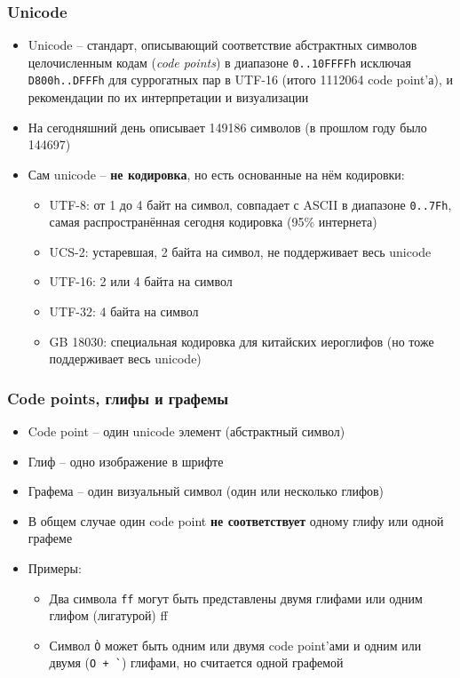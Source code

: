 \documentclass{beamer}
\begin{document}
\begin{frame}[fragile]
\frametitle{Unicode}
\begin{itemize}
\item Unicode -- стандарт, описывающий соответствие абстрактных символов целочисленным кодам (\textit{code points}) в диапазоне \verb|0..10FFFFh| исключая \verb|D800h..DFFFh| для суррогатных пар в UTF-16 (итого 1112064 code point'а), и рекомендации по их интерпретации и визуализации
\pause
\item На сегодняшний день описывает 149186 символов (в прошлом году было 144697)
\pause
\item Сам unicode -- \textbf{не кодировка}, но есть основанные на нём кодировки:
\pause
\begin{itemize}
\item UTF-8: от 1 до 4 байт на символ, совпадает с ASCII в диапазоне \verb|0..7Fh|, самая распространённая сегодня кодировка (95\% интернета)
\pause
\item UCS-2: устаревшая, 2 байта на символ, не поддерживает весь unicode
\pause
\item UTF-16: 2 или 4 байта на символ
\pause
\item UTF-32: 4 байта на символ
\pause
\item GB 18030: специальная кодировка для китайских иероглифов (но тоже поддерживает весь unicode)
\end{itemize}
\end{itemize}
\end{frame}

\begin{frame}[fragile]
\frametitle{Code points, глифы и графемы}
\begin{itemize}
\item Code point -- один unicode элемент (абстрактный символ)
\pause
\item Глиф -- одно изображение в шрифте
\pause
\item Графема -- один визуальный символ (один или несколько глифов)
\pause
\item В общем случае один code point \textbf{не соответствует} одному глифу или одной графеме
\pause
\item Примеры:
\begin{itemize}
\item Два символа \verb|ff| могут быть представлены двумя глифами или одним глифом (лигатурой) ff
\pause
\item Символ \verb|Ò| может быть одним или двумя code point'ами и одним или двумя (\verb|O + `|) глифами, но считается одной графемой
\end{itemize}
\end{itemize}
\end{frame}
\end{document}
